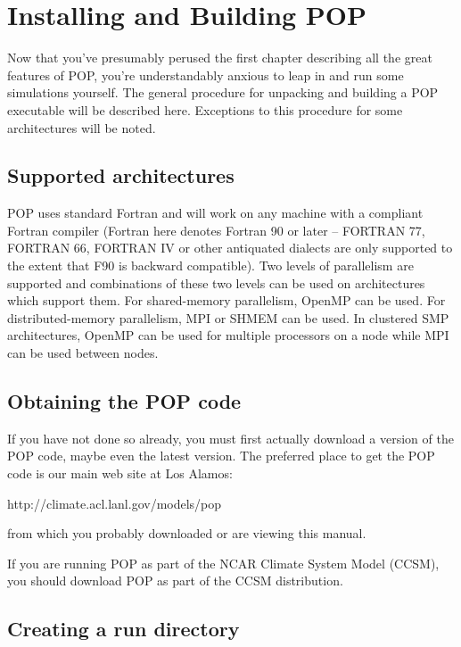 \chapter{Installing and Building POP}\label{ch:install-build}

Now that you've presumably perused the first chapter
describing all the great features of POP, you're
understandably anxious to leap in and run some
simulations yourself.
The general procedure for unpacking and building a POP executable
will be described here. Exceptions to this procedure for some
architectures will be noted.

\section{Supported architectures}\label{sec:architectures}

POP uses standard Fortran and will work on any machine
with a compliant Fortran compiler (Fortran here denotes
Fortran 90 or later -- FORTRAN 77, FORTRAN 66, FORTRAN IV
or other antiquated dialects are only supported to the
extent that F90 is backward compatible).
Two levels of parallelism are supported and combinations
of these two levels can be used on architectures which
support them.  For shared-memory parallelism, OpenMP
can be used.  For distributed-memory parallelism, MPI
or SHMEM can be used.  In clustered SMP architectures,
OpenMP can be used for multiple processors on a node while
MPI can be used between nodes.

\section{Obtaining the POP code}\label{sec:obtain}

If you have not done so already, you must first actually
download a version of the POP code, maybe even the latest
version.  The preferred place to get the POP code is our
main web site at Los Alamos:

\noindent
{}
                  {http://climate.acl.lanl.gov/models/pop}

\noindent
from which you probably downloaded or are viewing
this manual.

If you are running POP as part of the NCAR Climate
System Model (CCSM), you should download POP as
part of the CCSM distribution.

\section{Creating a run directory}\label{sec:create-directory}

